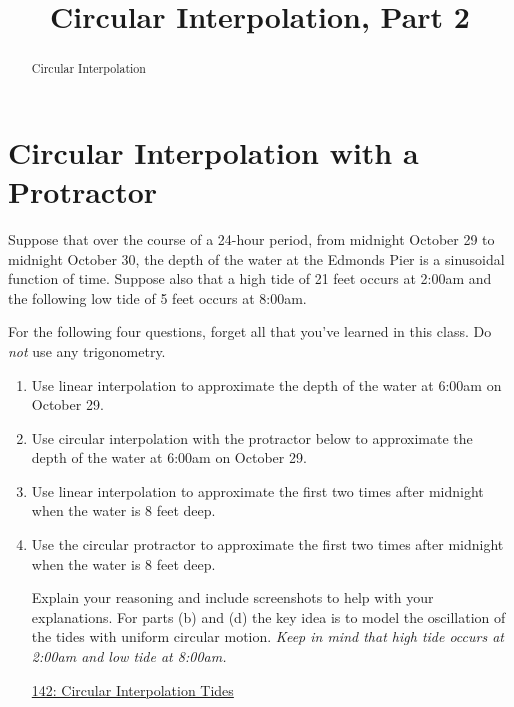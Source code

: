 \documentclass{ximera}
\title{Circular Interpolation, Part 2}
\begin{document}
\begin{abstract}
Circular Interpolation
\end{abstract}
\maketitle


\section{Circular Interpolation with a Protractor}



\begin{example}  \label{E888GGGbdsdsf}
Suppose that over the course of a 24-hour period, from midnight October 29 to midnight October 30, the depth of the water at the Edmonds Pier is a sinusoidal function of time. Suppose also that a high tide of 21 feet occurs at 2:00am and the following low tide of 5 feet occurs at 8:00am. 

For the following four questions, forget all that you've learned in this class.  Do \emph{not} use any trigonometry.

\begin{enumerate}
\item Use linear interpolation to approximate the depth of the water at 6:00am on October 29.

\item Use circular interpolation with the protractor below to approximate the depth of the water at 6:00am on October 29.

\item Use linear interpolation to approximate the first two times after midnight when the water is $8$ feet deep.

\item Use the circular protractor to approximate the first two times after midnight when the water is $8$ feet deep.

Explain your reasoning and include screenshots to help with your explanations. For parts (b) and (d) the key idea is to model the oscillation of the tides with uniform circular motion. \emph{Keep in mind that high tide occurs at 2:00am and low tide at 8:00am.}%


\begin{freeResponse}
\end{freeResponse}

\begin{onlineOnly}
    \begin{center}
\end{center}
\end{onlineOnly}

\href{https://www.desmos.com/calculator/0wxwmkzvky}{142: Circular Interpolation Tides}



\end{enumerate}
\end{example}
\end{document}
